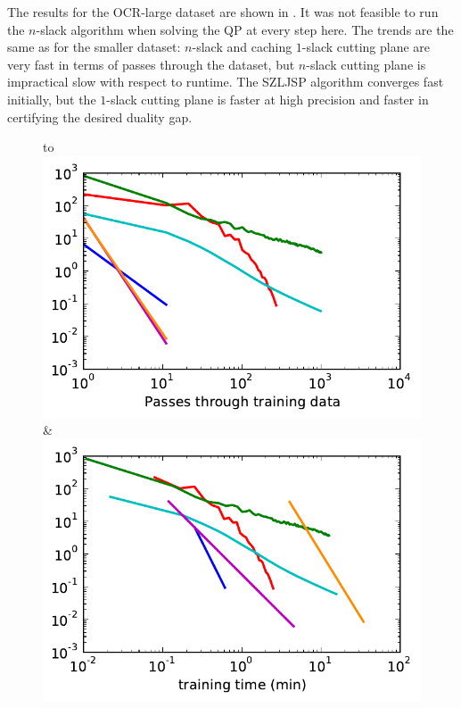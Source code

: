 The results for the OCR-large dataset are shown in . It was not feasible to run the $n$-slack
algorithm when solving the QP at every step here.
The trends are the same as for the smaller dataset: $n$-slack and caching $1$-slack cutting plane are very fast
in terms of passes through the dataset, but $n$-slack cutting plane is impractical slow
with respect to runtime. The SZLJSP algorithm converges fast initially, but the $1$-slack cutting plane
is faster at high precision and faster in certifying the desired duality gap.
\begin{figure}
    \begin{tabu} to 
    \\[-3mm]
    \includegraphics[width=\linewidth]{evaluation/images/scene_tree_log}&%
    \includegraphics[width=\linewidth]{evaluation/images/scene_tree_log_time}\\

\end{tabu}
\end{figure}
